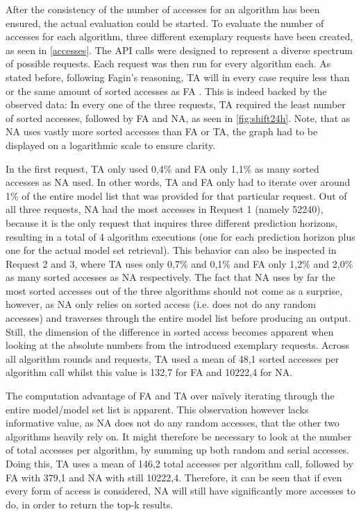 After the consistency of the number of accesses for an algorithm has been ensured, the actual evaluation could be started. To evaluate the number of accesses for each algorithm, three different exemplary requests have been created, as seen in \autoref{accesses}. The API calls were designed to represent a diverse spectrum of possible requests. Each request was then run for every algorithm each. As stated before, following Fagin’s reasoning, TA will in every case require less than or the same amount of sorted accesses as FA \cite{fagin2002}. This is indeed backed by the observed data: In every one of the three requests, TA required the least number of sorted accesses, followed by FA and NA, as seen in \autoref{fig:shift24h}. Note, that as NA uses vastly more sorted accesses than FA or TA, the graph had to be displayed on a logarithmic scale to ensure clarity. 

In the first request, TA only used 0,4\% and FA only 1,1\% as many sorted accesses as NA used. In other words, TA and FA only had to iterate over around 1\% of the entire model list that was provided for that particular request. Out of all three requests, NA had the most accesses in Request 1 (namely 52240), because it is the only request that inquires three different prediction horizons, resulting in a total of 4 algorithm executions (one for each prediction horizon plus one for the actual model set retrieval). This behavior can also be inspected in Request 2 and 3, where TA uses only 0,7\% and 0,1\% and FA only 1,2\% and 2,0\% as many sorted accesses as NA respectively. The fact that NA uses by far the most sorted accesses out of the three algorithms should not come as a surprise, however, as NA only relies on sorted access (i.e. does not do any random accesses) and traverses through the entire model list before producing an output. Still, the dimension of the difference in sorted access becomes apparent when looking at the absolute numbers from the introduced exemplary requests. Across all algorithm rounds and requests, TA used a mean of 48,1 sorted accesses per algorithm call whilst this value is 132,7 for FA and 10222,4 for NA.

The computation advantage of FA and TA over naïvely iterating through the entire model/model set list is apparent. This observation however lacks informative value, as NA does not do any random accesses, that the other two algorithms heavily rely on. It might therefore be necessary to look at the number of total accesses per algorithm, by summing up both random and serial accesses. Doing this, TA uses a mean of 146,2 total accesses per algorithm call, followed by FA with 379,1 and NA with still 10222,4. Therefore, it can be seen that if even every form of access is considered, NA will still have significantly more accesses to do, in order to return the top-k results. 

